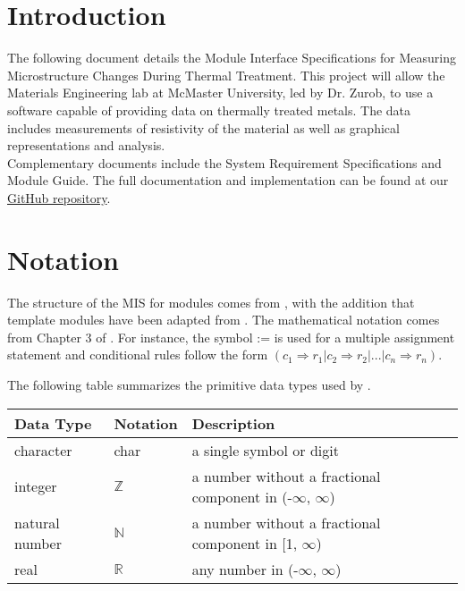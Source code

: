 \documentclass[12pt, titlepage]{article}
\begin{document}
\newpage


\section{Introduction}

\noindent The following document details the Module Interface Specifications for Measuring Microstructure Changes During Thermal Treatment. This project will allow the Materials Engineering lab at McMaster University, led by Dr. Zurob, to use a software capable of providing data on thermally treated metals. The data includes measurements of resistivity of the material as well as graphical representations and analysis. \\

\noindent Complementary documents include the System Requirement Specifications and Module Guide. The full documentation and implementation can be found at our \href{https://github.com/edwin-do/capstoneTeam30}{GitHub repository}.

\section{Notation}

The structure of the MIS for modules comes from \citet{HoffmanAndStrooper1995},
with the addition that template modules have been adapted from
\cite{GhezziEtAl2003}.  The mathematical notation comes from Chapter 3 of
\citet{HoffmanAndStrooper1995}.  For instance, the symbol := is used for a
multiple assignment statement and conditional rules follow the form $(c_1
\Rightarrow r_1 | c_2 \Rightarrow r_2 | ... | c_n \Rightarrow r_n )$.

The following table summarizes the primitive data types used by \progname. 

\begin{center}
\renewcommand{\arraystretch}{1.2}
\noindent 
\begin{tabular}{l l p{7.5cm}} 
\toprule 
\textbf{Data Type} & \textbf{Notation} & \textbf{Description}\\ 
\midrule
character & char & a single symbol or digit\\
integer & $\mathbb{Z}$ & a number without a fractional component in (-$\infty$, $\infty$) \\
natural number & $\mathbb{N}$ & a number without a fractional component in [1, $\infty$) \\
real & $\mathbb{R}$ & any number in (-$\infty$, $\infty$)\\
\bottomrule
\end{tabular} 
\end{center}
\end{document}
